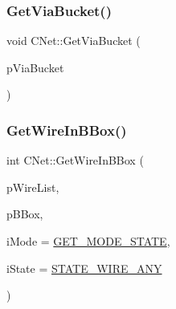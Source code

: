 \mbox{\label{classCNet_aa8ae0a7361da9afc30dab5b36a9a6c7d}} 
\subsubsection{\texorpdfstring{GetViaBucket()}{GetViaBucket()}}
{\footnotesize\ttfamily void C\+Net\+::\+Get\+Via\+Bucket (\begin{DoxyParamCaption}\item[{multimap$<$ \mbox{\hyperlink{res2dmp_8cpp_a8ae9d53f33f46cfcfcb9736e6351452a}{K\+EY}}, int $>$ $\ast$}]{p\+Via\+Bucket }\end{DoxyParamCaption})}

\mbox{\label{classCNet_a885207dedf1b08d52638bda17ba12227}} 
\subsubsection{\texorpdfstring{GetWireInBBox()}{GetWireInBBox()}}
{\footnotesize\ttfamily int C\+Net\+::\+Get\+Wire\+In\+B\+Box (\begin{DoxyParamCaption}\item[{vector$<$ \mbox{\hyperlink{classCWire}{C\+Wire}} $\ast$ $>$ $\ast$}]{p\+Wire\+List,  }\item[{\mbox{\hyperlink{classCBBox}{C\+B\+Box}} $\ast$}]{p\+B\+Box,  }\item[{int}]{i\+Mode = {\ttfamily \mbox{\hyperlink{BoxRouter_8h_a6f72f2cc9dd31793dd832ccfb2547de4}{G\+E\+T\+\_\+\+M\+O\+D\+E\+\_\+\+S\+T\+A\+TE}}},  }\item[{int}]{i\+State = {\ttfamily \mbox{\hyperlink{BoxRouter_8h_a1b285251edd87e1423189470586cc719}{S\+T\+A\+T\+E\+\_\+\+W\+I\+R\+E\+\_\+\+A\+NY}}} }\end{DoxyParamCaption})}

\mbox{\label{classCNet_a390a24e0f9ac1ac082746d09ebb35d23}} 
